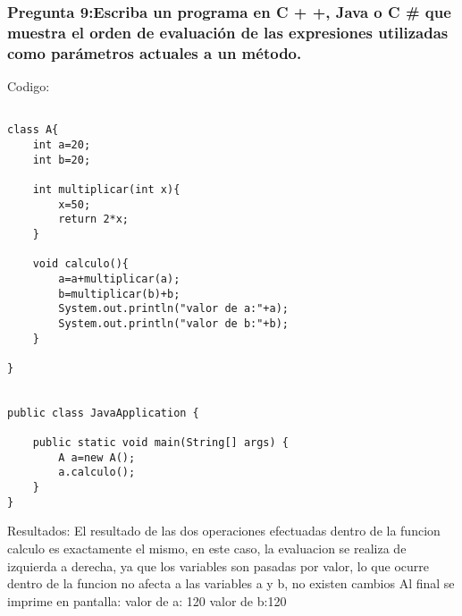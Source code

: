 \subsubsection{Pregunta 9:Escriba un programa en C + +, Java o C # que muestra el orden de evaluación de las expresiones utilizadas como parámetros actuales a un método.}


Codigo:\\

\lstset{language = Java} 
\begin{lstlisting}[frame = single] %Comienzo del Código

class A{
    int a=20;
    int b=20;
    
    int multiplicar(int x){
        x=50;
        return 2*x;
    }
    
    void calculo(){
        a=a+multiplicar(a);
        b=multiplicar(b)+b;
        System.out.println("valor de a:"+a);
        System.out.println("valor de b:"+b);
    }
    
}


public class JavaApplication {
    
    public static void main(String[] args) {
        A a=new A();
        a.calculo();
    }
}

\end{lstlisting}

Resultados:
El resultado de las dos operaciones efectuadas dentro de la funcion calculo es exactamente el mismo, en este caso, la evaluacion se realiza de izquierda a derecha, ya que los variables son pasadas por valor, lo que ocurre dentro de la funcion no afecta a las variables a y b, no existen cambios
Al final se imprime en pantalla: valor de a: 120 valor de b:120


